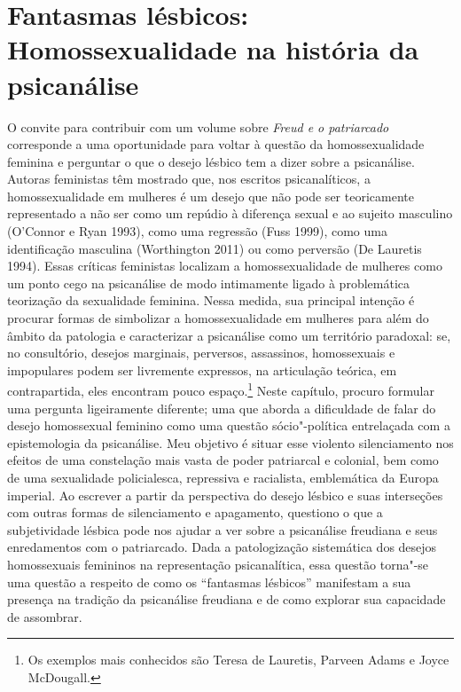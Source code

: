 \section{Fantasmas lésbicos: Homossexualidade na história da psicanálise}

O convite para contribuir com um volume sobre \emph{Freud e o
patriarcado} corresponde a uma oportunidade para voltar à questão da
homossexualidade feminina e perguntar o que o desejo lésbico tem a dizer
sobre a psicanálise. Autoras feministas têm mostrado que, nos escritos
psicanalíticos, a homossexualidade em mulheres é um desejo que não pode
ser teoricamente representado a não ser como um repúdio à diferença
sexual e ao sujeito masculino (O'Connor e Ryan 1993), como uma regressão
(Fuss 1999), como uma identificação masculina (Worthington 2011) ou como
perversão (De Lauretis 1994). Essas críticas feministas localizam a
homossexualidade de mulheres como um ponto cego na psicanálise de modo
intimamente ligado à problemática teorização da sexualidade feminina.
Nessa medida, sua principal intenção é procurar formas de simbolizar a
homossexualidade em mulheres para além do âmbito da patologia e
caracterizar a psicanálise como um território paradoxal: se, no
consultório, desejos marginais, perversos, assassinos, homossexuais e
impopulares podem ser livremente expressos, na articulação teórica, em
contrapartida, eles encontram pouco espaço.\footnote{Os exemplos mais
  conhecidos são Teresa de Lauretis, Parveen Adams e Joyce McDougall.}
Neste capítulo, procuro formular uma pergunta ligeiramente diferente;
uma que aborda a dificuldade de falar do desejo homossexual feminino
como uma questão sócio"-política entrelaçada com a epistemologia da
psicanálise. Meu objetivo é situar esse violento silenciamento nos
efeitos de uma constelação mais vasta de poder patriarcal e colonial,
bem como de uma sexualidade policialesca, repressiva e racialista,
emblemática da Europa imperial. Ao escrever a partir da perspectiva do
desejo lésbico e suas interseções com outras formas de silenciamento e
apagamento, questiono o que a subjetividade lésbica pode nos ajudar a
ver sobre a psicanálise freudiana e seus enredamentos com o patriarcado.
Dada a patologização sistemática dos desejos homossexuais femininos na
representação psicanalítica, essa questão torna"-se uma questão a
respeito de como os ``fantasmas lésbicos'' manifestam a sua presença na
tradição da psicanálise freudiana e de como explorar sua capacidade de
assombrar.

